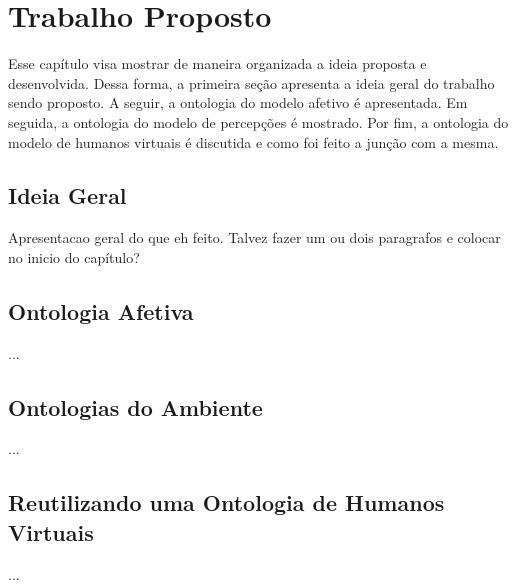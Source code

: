 \chapter{Trabalho Proposto} \label{cap:tp}

Esse capítulo visa mostrar de maneira organizada a ideia proposta e
desenvolvida. Dessa forma, a primeira seção apresenta a ideia geral do
trabalho sendo proposto. A seguir, a ontologia do modelo afetivo é
apresentada. Em seguida, a ontologia do modelo de percepções é mostrado. Por
fim, a ontologia do modelo de humanos virtuais é discutida e como foi feito a
junção com a mesma. 

\section{Ideia Geral}

Apresentacao geral do que eh feito.
Talvez fazer um ou dois paragrafos e colocar no inicio do capítulo?

\section{Ontologia Afetiva} \label{cap:tp:oa}

...

\section{Ontologias do Ambiente} \label{cap:tp:oda}

...

\section{Reutilizando uma Ontologia de Humanos Virtuais} \label{cap:tp:ruodhv}

...
